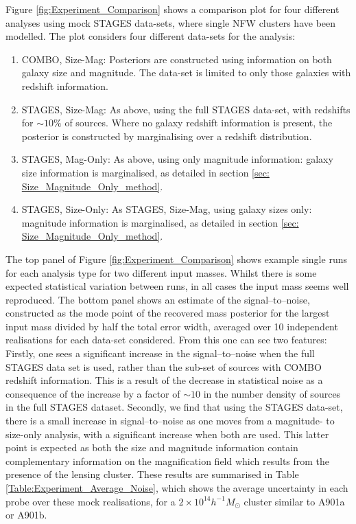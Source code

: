 \documentclass[useAMS,usenatbib,times,letter,amssymb]{mn2e}
\begin{document}
Figure \ref{fig:Experiment_Comparison} shows a comparison plot for four different analyses using mock STAGES data-sets, where single NFW clusters have been modelled. The plot considers four different data-sets for the analysis:
\begin{enumerate}
\item{COMBO, Size-Mag: Posteriors are constructed using information on both galaxy size and magnitude. The data-set is limited to only those galaxies with redshift information.}
\item{STAGES, Size-Mag: As above, using the full STAGES data-set, with redshifts for $\sim 10\%$ of sources. Where no galaxy redshift information is present, the posterior is constructed by marginalising over a redshift distribution.}
\item{STAGES, Mag-Only: As above, using only magnitude information: galaxy size information is marginalised, as detailed in section \ref{sec: Size_Magnitude_Only_method}.}
\item{STAGES, Size-Only: As STAGES, Size-Mag, using galaxy sizes only: magnitude information is marginalised, as detailed in section \ref{sec: Size_Magnitude_Only_method}.}
\end{enumerate}
The top panel of Figure \ref{fig:Experiment_Comparison} shows example single runs for each analysis type for two different input masses. Whilst there is some expected statistical variation between runs, in all cases the input mass seems well reproduced.  The bottom panel shows an estimate of the signal--to--noise, constructed as the mode point of the recovered mass posterior for the largest input mass divided by half the total error width, averaged over 10 independent realisations for each data-set considered.  From this one can see two features: Firstly, one sees a significant increase in the signal--to--noise when the full STAGES data set is used, rather than the sub-set of sources with COMBO redshift information. This is a result of the decrease in statistical noise as a consequence of the increase by a factor of $\sim 10$ in the number density of sources in the full STAGES dataset. Secondly, we find that using the STAGES data-set, there is a small increase in signal--to--noise as one moves from a magnitude- to size-only analysis, with a significant increase when both are used. This latter point is expected as both the size and magnitude information contain complementary information on the magnification field which results from the presence of the lensing cluster. These results are summarised in Table \ref{Table:Experiment_Average_Noise}, which shows the average uncertainty in each probe over these mock realisations, for a $2\times 10^{14} h^{-1}M_{\odot}$ cluster similar to A901a or A901b.
\end{document}
